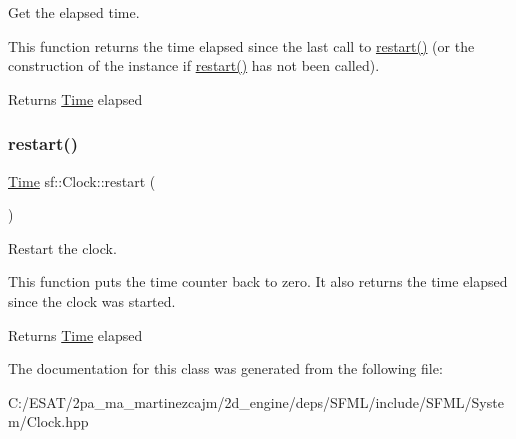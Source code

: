 Get the elapsed time. 

This function returns the time elapsed since the last call to \hyperlink{classsf_1_1_clock_a123e2627f2943e5ecaa1db0c7df3231b}{restart()} (or the construction of the instance if \hyperlink{classsf_1_1_clock_a123e2627f2943e5ecaa1db0c7df3231b}{restart()} has not been called).

\begin{DoxyReturn}{Returns}
\hyperlink{classsf_1_1_time}{Time} elapsed 
\end{DoxyReturn}
\mbox{\label{classsf_1_1_clock_a123e2627f2943e5ecaa1db0c7df3231b}} 
\subsubsection{\texorpdfstring{restart()}{restart()}}
{\footnotesize\ttfamily \hyperlink{classsf_1_1_time}{Time} sf\+::\+Clock\+::restart (\begin{DoxyParamCaption}{ }\end{DoxyParamCaption})}



Restart the clock. 

This function puts the time counter back to zero. It also returns the time elapsed since the clock was started.

\begin{DoxyReturn}{Returns}
\hyperlink{classsf_1_1_time}{Time} elapsed 
\end{DoxyReturn}


The documentation for this class was generated from the following file\+:\begin{DoxyCompactItemize}
\item 
C\+:/\+E\+S\+A\+T/2pa\+\_\+ma\+\_\+martinezcajm/2d\+\_\+engine/deps/\+S\+F\+M\+L/include/\+S\+F\+M\+L/\+System/Clock.\+hpp\end{DoxyCompactItemize}

